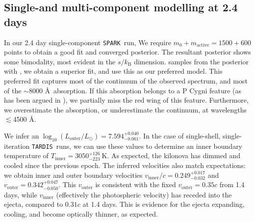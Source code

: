 \documentclass[twocolumn,twocolappendix]{aastex63}
\def\SPARK{\texttt{SPARK}}
\def\TARDIS{\texttt{TARDIS}}
\begin{document}
\subsection{Single-and multi-component modelling at 2.4 days}\label{ssc:2.4}

In our 2.4 day single-component \SPARK~run, We require $m_0 + m_{\mathrm{active}} = 1500 + 600$ points to obtain a good fit and converged posterior. The resultant posterior shows some bimodality, most evident in the $s/k_{\mathrm{B}}$ dimension.   samples from the posterior with , we obtain a superior fit, and use this as our preferred model.  This preferred fit captures most of the continuum of the observed spectrum, and most of the $\sim$8000 \AA~absorption. If this absorption belongs to a P Cygni feature (as has been argued in \citealt{watson19, sneppen23}), we partially miss the red wing of this feature. Furthermore, we overestimate the absorption, or underestimate the continuum, at wavelengths $\lesssim$4500 \AA. 

We infer an $\log_{10} (L_{\mathrm{outer}}/L_{\odot}) = 7.594^{+0.040}_{-0.061}$. In the case of single-shell, single-iteration \TARDIS~runs, we can use these values to determine an inner boundary temperature of $T_{\mathrm{inner}} = 3050^{+126}_{-223}~\mathrm{K}$. As expected, the kilonova has dimmed and cooled since the previous epoch. The inferred velocities also match expectations: we obtain inner and outer boundary velocities $v_{\mathrm{inner}}/c = 0.249^{+0.017}_{-0.032}$ and $v_{\mathrm{outer}} = 0.342^{+0.047}_{-0.050}$. This $v_{\mathrm{outer}}$ is consistent with the fixed $v_{\mathrm{outer}} = 0.35c$ from 1.4 days, while $v_{\mathrm{inner}}$ (effectively the photospheric velocity) has receded into the ejecta, compared to $0.31c$ at 1.4 days. This is evidence for the ejecta expanding, cooling, and become optically thinner, as expected.
\end{document}
